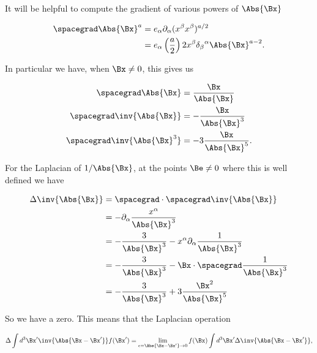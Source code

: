 It will be helpful to compute the gradient of various powers of \(\Abs{\Bx}\)

\begin{equation}\label{eqn:relativisticElectrodynamicsL18:780}
\begin{aligned}
\spacegrad \Abs{\Bx}^a
&=
e_\alpha \partial_\alpha (x^\beta x^\beta)^{a/2} \\
&=
e_\alpha \left(\frac{a}{2}\right) 2 x^\beta {\delta_\beta}^\alpha \Abs{\Bx}^{a - 2}.
\end{aligned}
\end{equation}

In particular we have, when \(\Bx \ne 0\), this gives us

\begin{equation}\label{eqn:relativisticElectrodynamicsL18:135}
\begin{aligned}
\spacegrad \Abs{\Bx} &= \frac{\Bx}{\Abs{\Bx}} \\
\spacegrad \inv{\Abs{\Bx}} &= -\frac{\Bx}{\Abs{\Bx}^3} \\
\spacegrad \inv{\Abs{\Bx}^3} &= -3 \frac{\Bx}{\Abs{\Bx}^5}.
\end{aligned}
\end{equation}

For the Laplacian of \(1/\Abs{\Bx}\), at the points \(\Be \ne 0\) where this is well defined we have

\begin{equation}\label{eqn:relativisticElectrodynamicsL18:800}
\begin{aligned}
\Delta \inv{\Abs{\Bx}} 
&=
\spacegrad \cdot \spacegrad \inv{\Abs{\Bx}} \\
&= 
-\partial_\alpha \frac{x^\alpha}{\Abs{\Bx}^3} \\
&= 
-\frac{3}{\Abs{\Bx}^3} 
- x^\alpha \partial_\alpha \frac{1}{\Abs{\Bx}^3} \\
&= 
-\frac{3}{\Abs{\Bx}^3} 
- \Bx \cdot \spacegrad \frac{1}{\Abs{\Bx}^3} \\
&= 
-\frac{3}{\Abs{\Bx}^3} 
+ 3 \frac{\Bx^2}{\Abs{\Bx}^5}
\end{aligned}
\end{equation}

So we have a zero.  This means that the Laplacian operation 

\begin{equation}\label{eqn:relativisticElectrodynamicsL18:300}
\Delta \int d^3 \Bx' \inv{\Abs{\Bx - \Bx'} } f(\Bx') 
=
\lim_{\epsilon = \Abs{\Bx -\Bx'} \rightarrow 0}
f(\Bx) \int d^3 \Bx' \Delta \inv{\Abs{\Bx - \Bx'}},
\end{equation}

